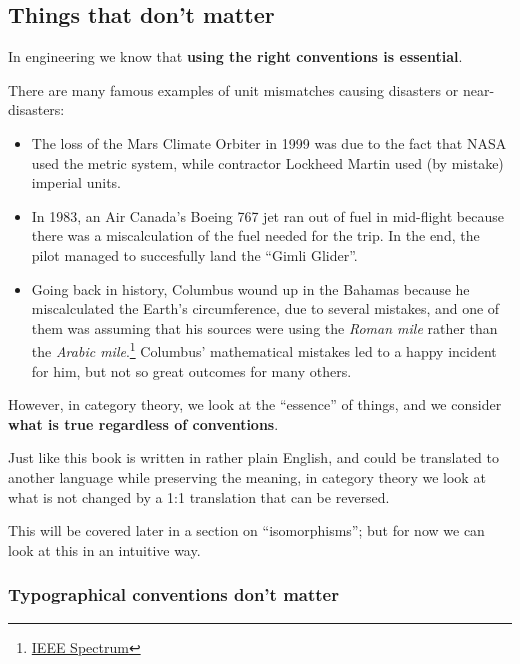 \subsection{Things that don't matter}

In engineering we know that \textbf{using the right conventions is essential}.

There are many famous examples of unit mismatches causing disasters or near-disasters:
\begin{itemize}
\item The loss of the Mars Climate Orbiter in 1999 was due to the fact that NASA used the metric system,
while contractor Lockheed Martin used (by mistake) imperial units.
\item In 1983, an  Air Canada’s Boeing 767 jet ran out of fuel in mid-flight because
there was a miscalculation of the fuel needed for the trip. In the end, the pilot managed to succesfully land the  ``Gimli Glider''.
\item  
Going back in history, Columbus wound up in the Bahamas because he miscalculated 
the Earth's circumference, due to several mistakes, and one of them was assuming
that his sources were using the \emph{Roman mile} rather than the \emph{Arabic mile}.\footnote{
\href{https://spectrum.ieee.org/tech-talk/at-work/test-and-measurement/columbuss-geographical-miscalculations}{IEEE Spectrum}
}
Columbus' mathematical mistakes led to a happy incident for him, but not so great outcomes for many others.
\end{itemize}

However, in category theory, we look at the ``essence'' of things, and we consider \textbf{what is true regardless of conventions}. 

Just like this book is written in rather plain English, and could be translated 
to another language while preserving the meaning, in category theory we look at 
what is not changed by a 1:1 translation that can be reversed. 

This will be covered later in a section on ``isomorphisms''; but for now we can look at this in an intuitive way.

\subsubsection{Typographical conventions don't matter}

